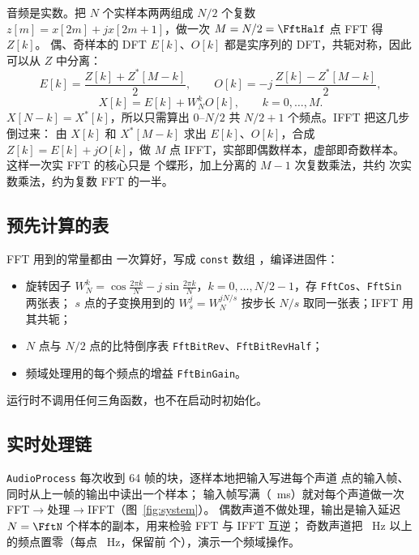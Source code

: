 \documentclass[zihao=-4, linespread=1.5, fontset=none]{ctexart}
\begin{document}
音频是实数。把 $N$ 个实样本两两组成 $N/2$ 个复数 $z[m]=x[2m]+jx[2m+1]$，做一次 $M=N/2=\FftHalf$ 点 FFT 得 $Z[k]$。
偶、奇样本的 DFT $E[k]$、$O[k]$ 都是实序列的 DFT，共轭对称，因此可以从 $Z$ 中分离：
\[
E[k]=\frac{Z[k]+Z^*[M-k]}2,\qquad
O[k]=-j\,\frac{Z[k]-Z^*[M-k]}2,
\]
\[
X[k]=E[k]+W_N^kO[k],\qquad k=0,\dots,M.
\]
$X[N-k]=X^*[k]$，所以只需算出 $0$--$N/2$ 共 $N/2+1$ 个频点。IFFT 把这几步倒过来：
由 $X[k]$ 和 $X^*[M-k]$ 求出 $E[k]$、$O[k]$，合成 $Z[k]=E[k]+jO[k]$，做 $M$ 点 IFFT，实部即偶数样本，虚部即奇数样本。
这样一次实 FFT 的核心只是 \HalfButterflies{} 个蝶形，加上分离的 $M-1$ 次复数乘法，共约 \RealMuls{} 次实数乘法，约为复数 FFT 的一半。

\subsection{预先计算的表}

FFT 用到的常量都由  一次算好，写成 \texttt{const} 数组 ，编译进固件：
\begin{itemize}
  \item 旋转因子 $W_N^k=\cos\frac{2\pi k}N-j\sin\frac{2\pi k}N$，$k=0,\dots,N/2-1$，存 \texttt{FftCos}、\texttt{FftSin} 两张表；
        $s$ 点的子变换用到的 $W_s^j=W_N^{jN/s}$ 按步长 $N/s$ 取同一张表；IFFT 用其共轭；
  \item $N$ 点与 $N/2$ 点的比特倒序表 \texttt{FftBitRev}、\texttt{FftBitRevHalf}；
  \item 频域处理用的每个频点的增益 \texttt{FftBinGain}。
\end{itemize}
运行时不调用任何三角函数，也不在启动时初始化。

\subsection{实时处理链}

\texttt{AudioProcess} 每次收到 64 帧的块，逐样本地把输入写进每个声道 \FftN{} 点的输入帧、同时从上一帧的输出中读出一个样本；
输入帧写满（\FrameMs~ms）就对每个声道做一次 FFT$\to$处理$\to$IFFT（图~\ref{fig:system}）。
偶数声道不做处理，输出是输入延迟 $N=\FftN$ 个样本的副本，用来检验 FFT 与 IFFT 互逆；
奇数声道把 \KeepHz~Hz 以上的频点置零（每点 \BinHz~Hz，保留前 \KeepBins{} 个），演示一个频域操作。
\end{document}
